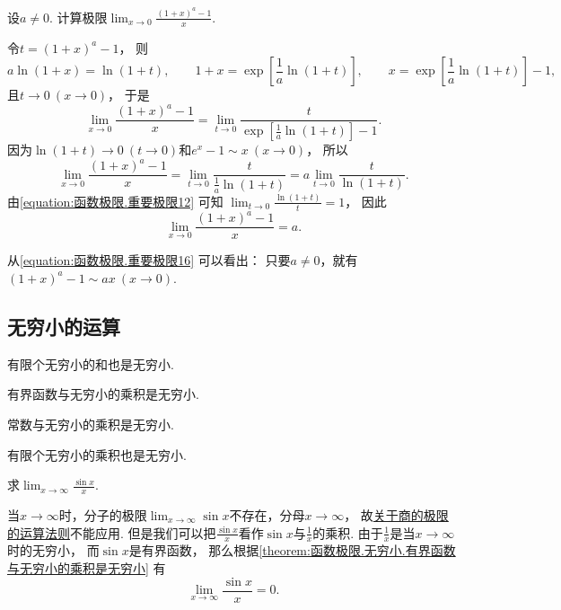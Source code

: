 \begin{example}
设\(a\neq0\).
计算极限\(\lim_{x\to0} \frac{(1+x)^a-1}x\).
\begin{solution}
令\(t = (1+x)^a-1\)，
则\[
	a \ln(1+x) = \ln(1+t),
	\qquad
	1+x=\exp[\frac1a \ln(1+t)],
	\qquad
	x=\exp[\frac1a \ln(1+t)]-1,
\]
且\(t\to0\ (x\to0)\)，
于是\[
	\lim_{x\to0} \frac{(1+x)^a-1}x
	= \lim_{t\to0} \frac{t}{\exp[\frac1a \ln(1+t)]-1}.
\]
因为\(\ln(1+t)\to0\ (t\to0)\)和\(e^x-1 \sim x\ (x\to0)\)，
所以\[
	\lim_{x\to0} \frac{(1+x)^a-1}x
	= \lim_{t\to0} \frac{t}{\frac1a \ln(1+t)}
	= a \lim_{t\to0} \frac{t}{\ln(1+t)}.
\]
由\cref{equation:函数极限.重要极限12} 可知
\(\lim_{t\to0} \frac{\ln(1+t)}{t} = 1\)，
因此\begin{equation}\label{equation:函数极限.重要极限16}
	\lim_{x\to0} \frac{(1+x)^a-1}x
	= a.
\end{equation}
\end{solution}
\end{example}
\begin{remark}
从\cref{equation:函数极限.重要极限16} 可以看出：
只要\(a\neq0\)，就有\((1+x)^a-1 \sim ax\ (x\to0)\).
\end{remark}

\subsection{无穷小的运算}
\begin{theorem}
有限个无穷小的和也是无穷小.
\end{theorem}

\begin{theorem}\label{theorem:函数极限.无穷小.有界函数与无穷小的乘积是无穷小}
有界函数与无穷小的乘积是无穷小.
\end{theorem}

\begin{corollary}
常数与无穷小的乘积是无穷小.
\end{corollary}

\begin{corollary}
有限个无穷小的乘积也是无穷小.
\end{corollary}

\begin{example}
求\(\lim_{x\to\infty} \frac{\sin x}{x}\).
\begin{solution}
当\(x\to\infty\)时，分子的极限\(\lim_{x\to\infty} \sin x\)不存在，分母\(x\to\infty\)，
故\hyperref[theorem:极限.极限的四则运算法则]{关于商的极限的运算法则}不能应用.
但是我们可以把\(\frac{\sin x}{x}\)看作\(\sin x\)与\(\frac1x\)的乘积.
由于\(\frac1x\)是当\(x\to\infty\)时的无穷小，
而\(\sin x\)是有界函数，
那么根据\cref{theorem:函数极限.无穷小.有界函数与无穷小的乘积是无穷小}
有\begin{equation}
	\lim_{x\to\infty} \frac{\sin x}{x} = 0.
\end{equation}
\end{solution}
\end{example}

